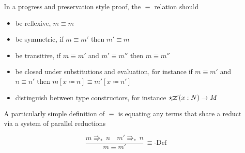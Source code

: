 In a progress and preservation style proof, the $\equiv$ relation
should
\begin{itemize}
\item be reflexive, $m\equiv m$ 
\item be symmetric, if $m\equiv m'$ then $m'\equiv m$ 
\item be transitive, if $m\equiv m'$ and $m'\equiv m''$ then $m\equiv m''$ 
\item be closed under substitutions and evaluation, for instance if $m\equiv m'$
and $n\equiv n'$ then $m\left[x\coloneqq n\right]\equiv m'\left[x\coloneqq n'\right]$ 
\item distinguish between type constructors, for instance $\star\cancel{\equiv}\left(x:N\right)\rightarrow M$ 
\end{itemize}
A particularly simple definition of $\equiv$ is equating any terms
that share a reduct via a system of parallel reductions

\[
\frac{m\Rrightarrow_{\ast}\,n\quad m'\Rrightarrow_{\ast}\,n}{m\equiv m'}\,\equiv\textrm{-Def}
\]

